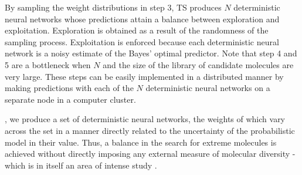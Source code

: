 By sampling the weight distributions in step 3, TS produces $N$ deterministic neural networks whose predictions attain a balance between exploration and exploitation. Exploration is obtained as a result of the randomness of the sampling process. Exploitation is enforced because each deterministic neural network is a noisy estimate of the Bayes' optimal predictor. 
Note that step 4 and 5 are a bottleneck when $N$ and the size of the library of candidate molecules are very large.
These steps can  be easily implemented in a distributed manner by making predictions with each of the $N$ deterministic neural networks on a separate node in a computer cluster.


, we produce a set of deterministic neural networks, the weights of which vary across the set in a manner directly related to the uncertainty of the probabilistic model in their value.  Thus, a balance in the search for extreme molecules is achieved without directly imposing any external measure of molecular diversity - which is in itself an area of intense study \cite{Maldonado_2006}.